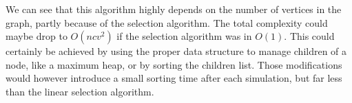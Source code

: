 We can see that this algorithm highly depends on the number of vertices in the graph, partly because of the selection algorithm. The total complexity could maybe drop to $O(ncv^2)$ if the selection algorithm was in $O(1)$. This could certainly be achieved by using the proper data structure to manage children of a node, like a maximum heap, or by sorting the children list. Those modifications would however introduce a small sorting time after each simulation, but far less than the linear selection algorithm.